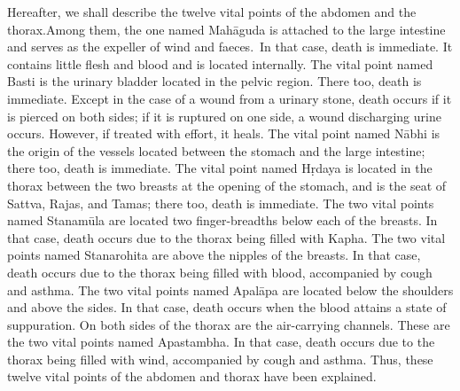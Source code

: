 \begin{translation}
\begin{tt}
\item[25]
Hereafter, we shall describe the twelve vital points of the abdomen and the thorax.Among them, the one named Mahāguda is attached to the large intestine and serves as the expeller of wind and faeces. In that case, death is immediate. It contains little flesh and blood and is located internally. The vital point named Basti is the urinary bladder located in the pelvic region. There too, death is immediate.
Except in the case of a wound from a urinary stone, death occurs if it is pierced on both sides; if it is ruptured on one side, a wound discharging urine occurs.
However, if treated with effort, it heals.
The vital point named Nābhi is the origin of the vessels located between the stomach and the large intestine; there too, death is immediate.
The vital point named Hṛdaya is located in the thorax between the two breasts at the opening of the stomach, and is the seat of Sattva, Rajas, and Tamas; there too, death is immediate.
The two vital points named Stanamūla are located two finger-breadths below each of the breasts.
In that case, death occurs due to the thorax being filled with Kapha.
The two vital points named Stanarohita are above the nipples of the breasts.
In that case, death occurs due to the thorax being filled with blood, accompanied by cough and asthma.
The two vital points named Apalāpa are located below the shoulders and above the sides.
In that case, death occurs when the blood attains a state of suppuration.
On both sides of the thorax are the air-carrying channels.
These are the two vital points named Apastambha.
In that case, death occurs due to the thorax being filled with wind, accompanied by cough and asthma.
Thus, these twelve vital points of the abdomen and thorax have been explained. 


\end{tt}
\end{translation}
